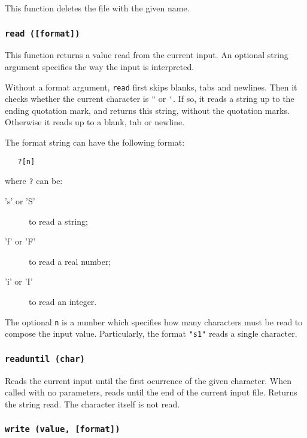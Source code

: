 This function deletes the file with the given name.

\subsubsection*{{\tt read ([format])}}

This function returns a value read from the current input.
An optional string argument specifies the way the input is interpreted.

Without a format argument, {\tt read} first skips blanks, tabs and newlines.
Then it checks whether the current character is \verb'"' or \verb-'-.
If so, it reads a string up to the ending quotation mark,
and returns this string, without the quotation marks.
Otherwise it reads up to a blank, tab or newline.

The format string can have the following format:
\begin{verbatim}
   ?[n]
\end{verbatim}
where \verb'?' can be:
\begin{description}
\item['s' or 'S'] to read a string;
\item['f' or 'F'] to read a real number;
\item['i' or 'I'] to read an integer.
\end{description}
The optional \verb'n' is a number which specifies how many characters
must be read to compose the input value.
Particularly, the format \verb'"s1"' reads a single character.

\subsubsection*{{\tt readuntil (char)}}

Reads the current input until the first ocurrence of the given character.
When called with no parameters,
reads until the end of the current input file.
Returns the string read.
The character itself is not read.

\subsubsection*{{\tt write (value, [format])}}

